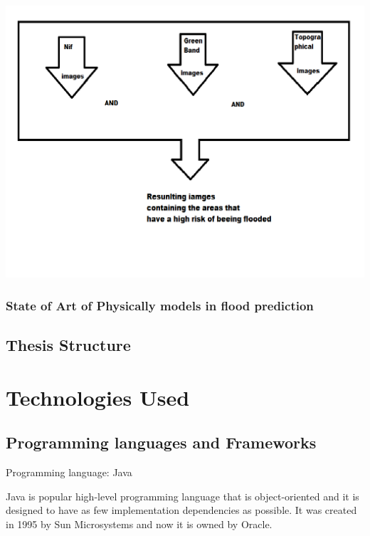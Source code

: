 \documentclass[12pt, a4paper]{report}
\begin{document}
\begin{center}
	\includegraphics[scale=0.6]{application_outline.png} 
\end{center}





\subsection{State of Art of Physically models in flood prediction}



\section{Thesis Structure}



\newpage{}


\chapter{Technologies Used}


\section{Programming languages and Frameworks} 

{\Large Programming language: Java\par}
\medskip


Java is popular high-level programming language that is object-oriented and it is designed to have as few implementation dependencies as possible. It was created in 1995 by Sun Microsystems and now it is owned by Oracle.
\par
\end{document}
